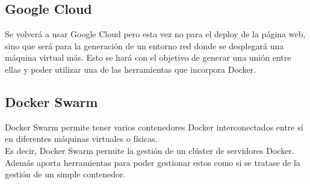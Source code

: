 \subsection{Google Cloud}
Se volverá a usar Google Cloud pero esta vez no para el deploy de la página web, sino que será para la generación de un entorno red donde se desplegará una máquina virtual más. Esto se hará con el objetivo de generar una unión entre ellas y poder utilizar una de las herramientas que incorpora Docker.

\subsection{Docker Swarm}

Docker Swarm permite tener varios contenedores Docker interconectados entre sí en diferentes máquinas virtuales o físicas.
\\Es decir, Docker Swarm permite la gestión de un clúster de servidores Docker. Además aporta herramientas para poder gestionar estos como si se tratase de la gestión de un simple contenedor.
